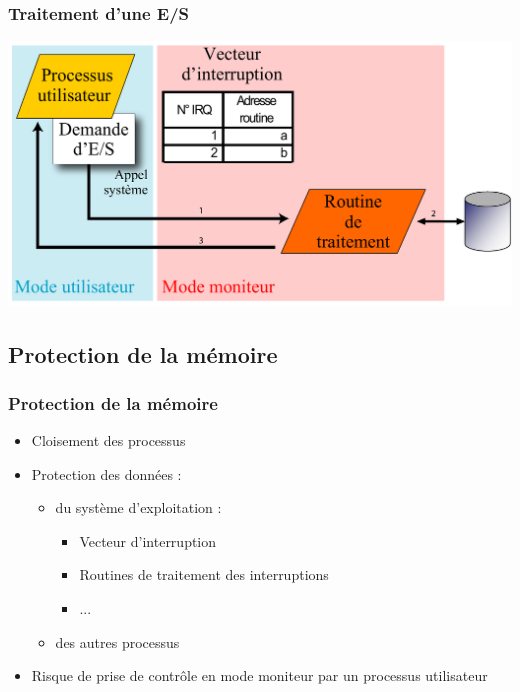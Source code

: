\begin{frame}
 \frametitle{Traitement d’une E/S}
 \includegraphics[width=\textwidth]{../illustration/ES_mode_double.pdf}
\end{frame}


\subsection{Protection de la mémoire}

\begin{frame}
  \frametitle{Protection de la mémoire}
  \begin{itemize}
\item Cloisement des processus
  \item Protection des données :
\begin{itemize}
\item du système d’exploitation :
\begin{itemize}
\item Vecteur d’interruption
\item Routines de traitement des interruptions
\item ...
\end{itemize}
\item des autres processus
\end{itemize}
\item Risque de prise de contrôle en mode moniteur par un processus utilisateur
  \end{itemize}
 \end{frame}

